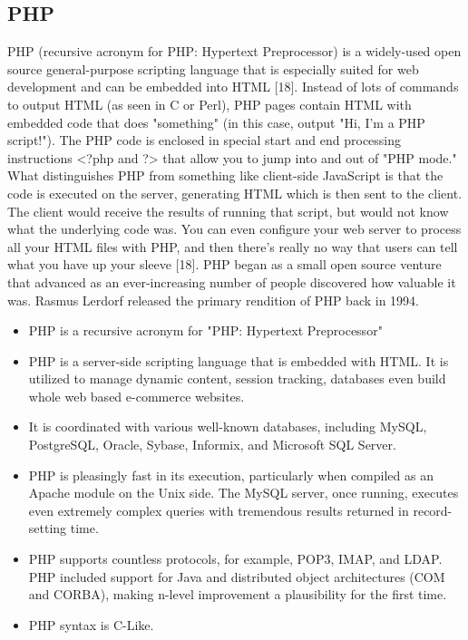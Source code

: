 \documentclass[../thesis.tex]{subfiles}
\begin{document}
\subsection{PHP}
PHP (recursive acronym for PHP: Hypertext Preprocessor) is a widely-used open source general-purpose scripting language that is especially suited for web development and can be embedded into HTML [18].
\vspace{5mm}
Instead of lots of commands to output HTML (as seen in C or Perl), PHP pages contain HTML with embedded code that does "something" (in this case, output "Hi, I'm a PHP script!"). The PHP code is enclosed in special start and end processing instructions <?php and ?> that allow you to jump into and out of "PHP mode."
\vspace{5mm}
What distinguishes PHP from something like client-side JavaScript is that the code is executed on the server, generating HTML which is then sent to the client. The client would receive the results of running that script, but would not know what the underlying code was. You can even configure your web server to process all your HTML files with PHP, and then there's really no way that users can tell what you have up your sleeve [18].
\vspace{5mm}
PHP began as a small open source venture that advanced as an ever-increasing number of people discovered how valuable it was. Rasmus Lerdorf released the primary rendition of PHP back in 1994.
\vspace{5mm}
\begin{itemize}
  \item PHP is a recursive acronym for "PHP: Hypertext Preprocessor"
  \item PHP is a server-side scripting language that is embedded with HTML. It is utilized to manage dynamic content, session tracking, databases even build whole web based e-commerce websites. 
  \item It is coordinated with various well-known databases, including MySQL, PostgreSQL, Oracle, Sybase, Informix, and Microsoft SQL Server. 
  \item PHP is pleasingly fast in its execution, particularly when compiled as an Apache module on the Unix side. The MySQL server, once running, executes even extremely complex queries with tremendous results returned in record-setting time. 
  \item PHP supports countless protocols, for example, POP3, IMAP, and LDAP. PHP included support for Java and distributed object architectures (COM and CORBA), making n-level improvement a plausibility for the first time. 
  \item PHP syntax is C-Like.  
\end{itemize}
\end{document}
